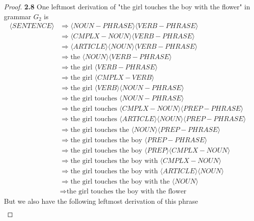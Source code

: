 \documentclass[11pt]{article}
\theoremstyle{definition}
\begin{document}
\begin{proof}{\textbf{2.8}}
    One leftmost derivation of "the girl touches the boy with the flower" in
    grammar $G_2$ is
    \begin{align*}
        \langle SENTENCE \rangle
        &\Rightarrow \langle NOUN-PHRASE \rangle\langle VERB-PHRASE \rangle\\
        &\Rightarrow \langle CMPLX-NOUN \rangle\langle VERB-PHRASE \rangle\\
        &\Rightarrow \langle ARTICLE \rangle\langle NOUN \rangle
        \langle VERB-PHRASE \rangle\\
        &\Rightarrow \text{the }\langle NOUN \rangle\langle VERB-PHRASE \rangle\\
        &\Rightarrow \text{the girl }\langle VERB-PHRASE \rangle\\
        &\Rightarrow \text{the girl }\langle CMPLX-VERB \rangle\\
        &\Rightarrow \text{the girl }\langle VERB \rangle
        \langle NOUN-PHRASE \rangle\\
        &\Rightarrow \text{the girl touches }\langle NOUN-PHRASE \rangle\\
        &\Rightarrow \text{the girl touches }
        \langle CMPLX-NOUN \rangle\langle PREP-PHRASE \rangle\\
        &\Rightarrow \text{the girl touches }\langle ARTICLE \rangle
        \langle NOUN \rangle\langle PREP-PHRASE \rangle\\
        &\Rightarrow \text{the girl touches the }
        \langle NOUN \rangle\langle PREP-PHRASE \rangle\\
        &\Rightarrow \text{the girl touches the boy }
        \langle PREP-PHRASE \rangle\\
        &\Rightarrow \text{the girl touches the boy }
        \langle PREP \rangle\langle CMPLX-NOUN \rangle\\
        &\Rightarrow \text{the girl touches the boy with }
        \langle CMPLX-NOUN \rangle\\
        &\Rightarrow \text{the girl touches the boy with }
        \langle ARTICLE \rangle\langle NOUN \rangle\\
        &\Rightarrow \text{the girl touches the boy with the }
        \langle NOUN \rangle\\
        &\Rightarrow \text{the girl touches the boy with the flower}
    \end{align*}
    But we also have the following leftmost derivation of this phrase
    \begin{align*}

\end{align*}
\end{proof}
\end{document}

